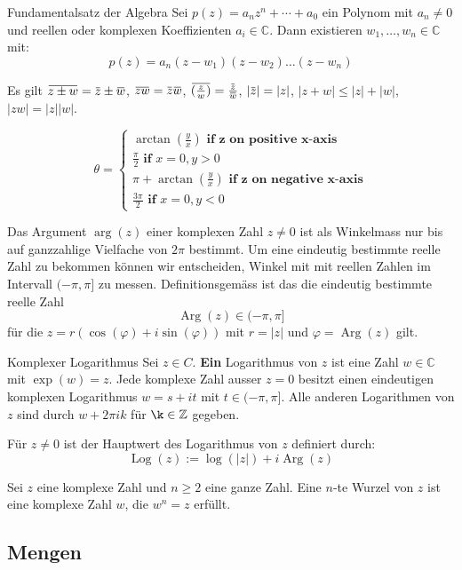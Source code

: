 \documentclass[a4paper,10pt]{article}
\DeclareMathOperator{\Arg}{Arg}
\DeclareMathOperator{\Log}{Log}
\def\C{\mathbb{C}}
\newcommand{\overbar}[1]{\mkern 1.5mu\overline{\mkern-1.5mu#1\mkern-1.5mu}\mkern 1.5mu}
\begin{document}
\begin{mainbox}{Fundamentalsatz der Algebra}
  Sei $p(z) = a_n z^n + \cdots + a_0$ ein Polynom mit $a_n \neq 0$ und reellen oder komplexen Koeffizienten $a_i \in \mathbb{C}$. Dann existieren $w_1, \ldots, w_n \in \C$ mit:
  $$
    p(z) = a_n (z - w_1) (z - w_2) \ldots (z - w_n)
  $$
\end{mainbox}

Es gilt $\overbar{z \pm w} = \overbar{z} \pm \overbar{w}$, $\overbar{zw} = \overbar{z}\overbar{w}$, $\overbar{(\frac{z}{w})} = \frac{\overbar{z}}{\overbar{w}}$, $|\overbar{z}| = |z|$, $|z + w| \leq |z| + |w|$, $|zw| = |z| |w|$.

$$
\theta = \begin{cases}
  \arctan(\frac{y}{x}) \textbf{ if z on positive x-axis}\\
  \frac{\pi}{2} \textbf{ if }x=0, y > 0\\
  \pi + \arctan(\frac{y}{x}) \textbf{ if z on negative x-axis}\\
  \frac{3\pi}{2} \textbf{ if }x=0, y < 0
\end{cases}
$$

Das Argument $\arg(z)$ einer komplexen Zahl $z \neq 0$ ist als Winkelmass nur bis auf ganzzahlige Vielfache von $2\pi$ bestimmt. Um eine eindeutig bestimmte reelle Zahl zu bekommen können wir entscheiden, Winkel mit mit reellen Zahlen im Intervall $(-\pi,\pi]$ zu messen. Definitionsgemäss ist das die eindeutig bestimmte reelle Zahl
$$
\Arg(z) \in (-\pi, \pi]
$$
für die $z = r(\cos(\varphi) + i \sin(\varphi))$ mit $r = |z|$ und $\varphi = \Arg(z)$ gilt.

\begin{mainbox}{Komplexer Logarithmus}
  Sei $z \in C$. \textbf{Ein} Logarithmus von $z$ ist eine Zahl $w \in \C$ mit $\exp(w) = z$. Jede komplexe Zahl ausser $z = 0$ besitzt einen eindeutigen komplexen Logarithmus $w = s + it$ mit $t \in (-\pi, \pi]$. Alle anderen Logarithmen von $z$ sind durch $w + 2\pi ik$ für $\k \in \mathbb{Z}$ gegeben.

  Für $z \neq 0$ ist der Hauptwert des Logarithmus von $z$ definiert durch:
  $$
    \Log(z) := \log(|z|) + i \Arg(z)
  $$
\end{mainbox}

Sei \(z\) eine komplexe Zahl und \(n\geq2\) eine ganze Zahl. Eine \(n\)-te Wurzel von \(z\) ist eine komplexe Zahl \(w\), die \(w^n=z\) erfüllt.

\subsection{Mengen}
\end{document}
